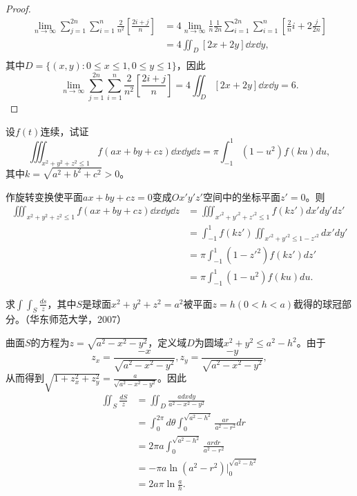 \begin{proof}
  \begin{align*}
  \lim_{n\rightarrow\infty}\sum_{j=1}^{2n}\sum_{i=1}^n\frac{2}{n^2}[\frac{2i+j}{n}]&=4\lim_{n\rightarrow\infty}\frac{1}{n}\frac{1}{2n}\sum_{i=1}^{2n}\sum_{i=1}^n[\frac{2}{n}i+2\frac{j}{2n}]\\
  &=4\iint_D[2x+2y]\dd x\dd y,\\
  \end{align*}
  其中$D=\{(x,y):0\leq x\leq1,0\leq y\leq1\}$，因此
  $$\lim_{n\rightarrow\infty}\sum_{j=1}^{2n}\sum_{i=1}^n\frac{2}{n^2}[\frac{2i+j}{n}]=4\iint_D[2x+2y]\dd x\dd y=6.$$
  \end{proof}
  
\begin{exercise}
   设$f(t)$连续，试证
   \begin{equation*}
   \iiint_{x^2+y^2+z^2\leq1}f(ax+by+cz)\dd x \dd y\dd z 
   =\pi\int_{-1}^1(1-u^2)f(ku)du,
   \end{equation*}
   其中$k=\sqrt{a^2+b^2+c^2}>0$。%
  \end{exercise}

\begin{solution}
  作旋转变换使平面$ax+by+cz=0$变成$Ox'y'z'$空间中的坐标平面$z'=0$。则
  \begin{align*}
  \iiint_{x^2+y^2+z^2\leq 1}f(ax+by+cz)\dd x\dd y\dd z
  &=\iiint_{x'^2+y'^2+z'^2\leq1}f(kz')dx'dy'dz'\\
  &=\int_{-1}^1f(kz')\iint_{x'^2+y'^2\leq1-z'^2}dx'dy'\\
  &=\pi\int_{-1}^1(1-z'^2)f(kz')dz'\\
  &=\pi\int_{-1}^1(1-u^2)f(ku)du.
  \end{align*} 
\end{solution}
  
  \begin{exercise}
  求$\int\int_S\frac{ds}z$，其中$S$是球面$x^2+y^2+z^2=a^2$被平面$z=h(0<h<a)$截得的球冠部分。（华东师范大学，2007）  
  
   曲面$S$的方程为$z=\sqrt{a^2-x^2-y^2}$，定义域$D$为圆域$x^2+y^2\leq a^2-h^2$。由于$$z_x=\frac{-x}{\sqrt{a^2-x^2-y^2}},z_y=\frac{-y}{\sqrt{a^2-x^2-y^2}},$$
  从而得到$\sqrt{1+z_x^2+z_y^2}=\frac{a}{\sqrt{a^2-x^2-y^2}}$。因此
  \begin{align*}
  \iint_S\frac{dS}{z}&=\iint_D\frac{adxdy}{a^2-x^2-y^2}\\
  &=\int_0^{2\pi}d\theta\int_0^{\sqrt{a^2-h^2}}\frac{ar}{a^2-r^2}dr\\
  &=2\pi a\int_0^{\sqrt{a^2-h^2}}\frac{ardr}{a^2-r^2}\\
  &=-\pi a\ln(a^2-r^2)|_0^{\sqrt{a^2-h^2}}\\
  &=2a\pi\ln\frac{a}{h}.\\
  \end{align*} 
  \end{exercise}
  
